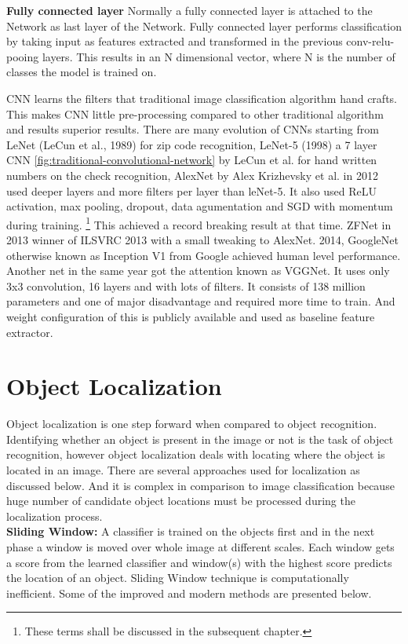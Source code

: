 \newpara \textbf{Fully connected layer}
Normally a fully connected layer is attached to the Network as last layer of the Network. Fully connected layer performs classification by taking input as features extracted and transformed in the previous conv-relu-pooing layers. This results in an N dimensional vector, where N is the number of classes the model is trained on.

\newpara CNN learns the filters that traditional image classification algorithm hand crafts. This makes CNN little pre-processing compared to other traditional algorithm and results superior results. There are many evolution of CNNs starting from LeNet (LeCun et al., 1989) for zip code recognition, LeNet-5 (1998) a 7 layer CNN \ref{fig:traditional-convolutional-network} by LeCun et al. for hand written numbers on the check recognition, AlexNet by Alex Krizhevsky et al. in 2012 used deeper layers and more filters per layer than leNet-5. It also used ReLU activation, max pooling, dropout, data agumentation and SGD with momentum during training. \footnote{These terms shall be discussed in the subsequent chapter.} This achieved a record breaking result at that time. ZFNet in 2013 winner of ILSVRC 2013 with a small tweaking to AlexNet. 2014, GoogleNet otherwise known as Inception V1 from Google achieved human level performance. Another net in the same year got the attention known as VGGNet. It uses only 3x3 convolution, 16 layers and with lots of filters. It consists of 138 million parameters and one of major disadvantage and required more time to train. And weight configuration of this is publicly available and used as baseline feature extractor.

\section {Object Localization } Object localization is one step forward when compared to object recognition. Identifying whether an object is present in the image or not is the task of object recognition, however object localization deals with locating where the object is located in an image. There are several approaches used for localization as discussed below. And it is complex in comparison to image classification because huge number of candidate object locations must be processed during the localization process. \\

\textbf{Sliding Window:} A classifier is trained on the objects first and in the next phase a window is moved over whole image at different scales. Each window gets a score from the learned classifier and window(s) with the highest score predicts the location of an object. Sliding Window technique is computationally inefficient. Some of the improved and modern methods are presented below. 

